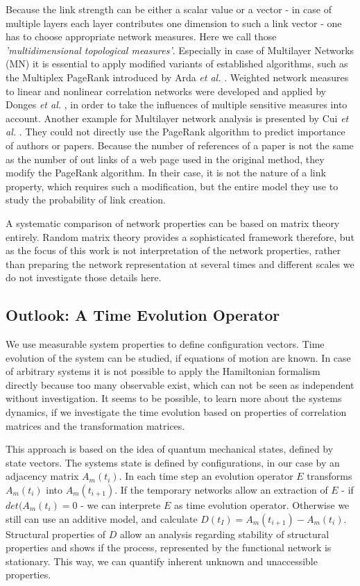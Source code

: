 \documentclass[a4paper,10pt]{scrbook}
\begin{document}
Because the link strength can be either a scalar value or a vector - in case of multiple layers each layer contributes one dimension to such a link vector - one has to choose appropriate network measures. Here we call those \textit{'multidimensional topological measures'}. Especially in case of Multilayer Networks (MN) it is essential to apply modified variants of established algorithms, such as the Multiplex PageRank introduced by Arda \textit{et al.} \cite{Arda2013}. Weighted network measures to linear and nonlinear correlation networks were developed and applied by Donges \textit{et al.} \cite{Donges2009, Donges2009a, Donges2011}, in order to take the influences of multiple sensitive measures into account. Another example for Multilayer network analysis is presented by Cui \textit{et al.} \cite{Cui2010}. They could not directly use the PageRank algorithm to predict importance
of authors or papers. Because the number of references of a paper is not the same as the number 
of out links of a web page used in the original method, they modify the PageRank algorithm. In their case, it is not the nature of a link property, which requires such a modification, but the entire model they use to study the probability of link creation.

A systematic comparison of network properties can be based on matrix theory entirely. Random matrix theory provides a sophisticated framework therefore, but as the focus of this work is not interpretation of the network properties, rather than preparing the network representation at several times and different scales we do not investigate those details here.

\subsection{Outlook: A Time Evolution Operator}
We use measurable system properties to define configuration vectors. Time evolution of the system can be studied, if equations of motion are known. In case of arbitrary systems it is not possible to apply the Hamiltonian formalism directly because too many observable exist, which can not be seen as independent without investigation. It seems to be possible, to learn more about the systems dynamics, if we investigate the time evolution based on properties of correlation matrices and the transformation matrices. 

This approach is based on the idea of quantum mechanical states, defined by state vectors. The systems state is defined by configurations, in our case by an adjacency matrix $A_m (t_i)$. In each time step an evolution operator $E$ transforms $A_m (t_i)$ into $A_m (t_{i+1})$. If the temporary networks allow an extraction of $E$ - if $det(A_m (t_i) = 0$ - we can interprete $E$ as time evolution operator. Otherwise we still can use an additive model, and calculate $D(t_{I}) = A_m (t_{i+1}) - A_m (t_{i})$. Structural properties of $D$ allow an analysis regarding stability of structural properties and shows if the process, represented by the functional network is stationary. This way, we can quantify inherent unknown and unaccessible properties. 
\end{document}
